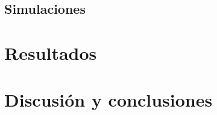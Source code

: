 \documentclass[a4paper,11pt]{article}
\begin{document}
\pagestyle{plain}

\thispagestyle{empty}


\newpage
\thispagestyle{empty}
\mbox{}

\newpage


\newpage
\thispagestyle{empty}
\tableofcontents

\newpage
\thispagestyle{empty}
\listoffigures

\newpage
\thispagestyle{empty}
\listoftables


\newpage


\newpage


\newpage


\newpage



\newpage
\subsection{Simulaciones}

\newpage


\newpage
\section{Resultados}

\newpage
\section{Discusión y conclusiones}

\newpage
\begin{flushleft}
  
  
\end{flushleft}

\newpage

\end{document}
